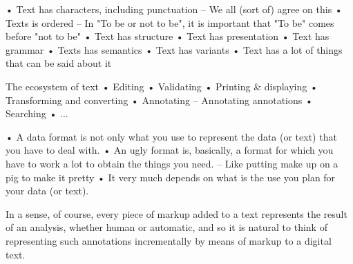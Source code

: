 • Text has characters, including punctuation
– We all (sort of) agree on this
• Texts is ordered
– In "To be or not to be", it is important that "To be"
comes before "not to be"
• Text has structure
• Text has presentation
• Text has grammar
• Texts has semantics
• Text has variants
• Text has a lot of things that can be said about it 



The ecosystem of text
• Editing
• Validating
• Printing & displaying
• Transforming and converting
• Annotating
– Annotating annotations
• Searching
• ... 

• A data format is not only what you use to
represent the data (or text) that you have to
deal with.
• An ugly format is, basically, a format for which
you have to work a lot to obtain the things you
need.
– Like putting make up on a pig to make it pretty
• It very much depends on what is the use you
plan for your data (or text). 

In a sense, of course, every piece of markup added to a text represents the result of an analysis, whether human or automatic, and so it is natural to think of representing such annotations incrementally by means of markup to a digital text.